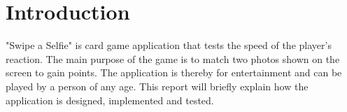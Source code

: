 \section{Introduction}
"Swipe a Selfie" is card game application that tests the speed of the player’s reaction. The main purpose of the game is to match two photos shown on the screen to gain points. The application is thereby for entertainment and can be played by a person of any age. This report will briefly explain how the application is designed, implemented and tested.

